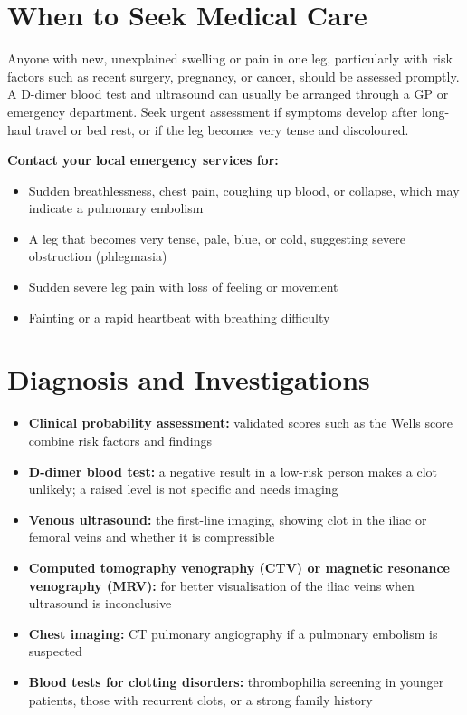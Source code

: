 \section*{When to Seek Medical Care}
Anyone with new, unexplained swelling or pain in one leg, particularly with risk factors such as recent surgery, pregnancy, or cancer, should be assessed promptly. A D-dimer blood test and ultrasound can usually be arranged through a GP or emergency department. Seek urgent assessment if symptoms develop after long-haul travel or bed rest, or if the leg becomes very tense and discoloured.

\textbf{Contact your local emergency services for:}
\begin{itemize}
    \item Sudden breathlessness, chest pain, coughing up blood, or collapse, which may indicate a pulmonary embolism
    \item A leg that becomes very tense, pale, blue, or cold, suggesting severe obstruction (phlegmasia)
    \item Sudden severe leg pain with loss of feeling or movement
    \item Fainting or a rapid heartbeat with breathing difficulty
\end{itemize}

\section*{Diagnosis and Investigations}
\begin{itemize}
    \item \textbf{Clinical probability assessment:} validated scores such as the Wells score combine risk factors and findings
    \item \textbf{D-dimer blood test:} a negative result in a low-risk person makes a clot unlikely; a raised level is not specific and needs imaging
    \item \textbf{Venous ultrasound:} the first-line imaging, showing clot in the iliac or femoral veins and whether it is compressible
    \item \textbf{Computed tomography venography (CTV) or magnetic resonance venography (MRV):} for better visualisation of the iliac veins when ultrasound is inconclusive
    \item \textbf{Chest imaging:} CT pulmonary angiography if a pulmonary embolism is suspected
    \item \textbf{Blood tests for clotting disorders:} thrombophilia screening in younger patients, those with recurrent clots, or a strong family history
\end{itemize}


